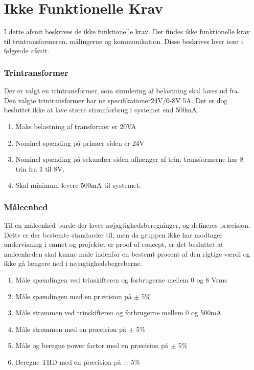 
\section{Ikke Funktionelle Krav}
I dette afsnit beskrives de ikke funktionelle krav. Der findes ikke funktionelle krav til trintransformeren, målingerne og kommunikation. Disse beskrives hver især i følgende afsnit.

\subsubsection{Trintransformer}
Der er valgt en trintransformer, som simulering af belastning skal laves ud fra. Den valgte trintransformer har ne specifikationer24V/0-8V 5A. Det er dog besluttet ikke at lave større strømforbrug i systemet end 500mA. 

\begin{enumerate}
	\item Maks belastning af transformer er 20VA
	\item Nominel spænding på primær siden er 24V
	\item Nominel spænding på sekundær siden afhænger af trin, transformerne har 8 trin fra 1 til 8V.
	\item Skal minimum levere 500mA til systemet. 
\end{enumerate}

\subsubsection{Måleenhed}
Til en måleenhed burde der laves nøjagtighedsberegninger, og defineres præcision. Dette er der bestemte standarder til, men da gruppen ikke har modtager undervisning i emnet og projektet er proof of concept, er det besluttet at måleenheden skal kunne måle indenfor en bestemt procent af den rigtige værdi og ikke gå længere ned i nøjagtighedsbegreberne.

\begin{enumerate}
	\item Måle spændingen ved trinskifteren og forbrugerne mellem 0 og 8 Vrms
	\item Måle spændingen med en præcision på $\pm$ 5\%
	\item Måle strømmen ved trinskifteren og forbrugerne mellem 0 og 500mA
	\item Måle strømmen med en præcision på $\pm$ 5\%
	\item Måle og beregne power factor med en præcision på $\pm$ 5$\%$
	\item Beregne THD med en præcision på $\pm$ 5$\%$
\end{enumerate} 

